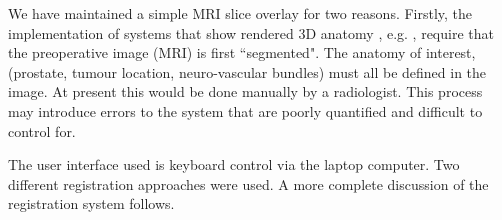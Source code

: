 We have maintained a simple MRI slice overlay  
for two reasons. Firstly, the implementation of systems that show rendered 3D anatomy
, e.g. \cite{pap178,pap208}, require that the preoperative image (MRI) 
is first ``segmented". The anatomy of interest, 
(prostate, tumour location, neuro-vascular bundles) must all be defined 
in the image. At present this would be done manually by a radiologist.
This process may introduce errors to the system that are poorly quantified and
difficult to control for.

The user interface used is keyboard 
control via the laptop computer. Two different registration 
approaches were used. A more complete discussion of the registration 
system follows.









